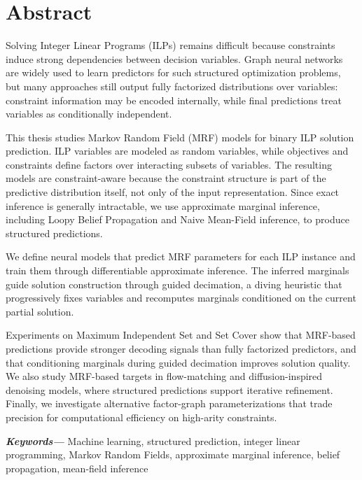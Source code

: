 \chapter*{Abstract}
    
Solving Integer Linear Programs (ILPs) remains difficult because constraints induce strong dependencies between decision variables. Graph neural networks are widely used to learn predictors for such structured optimization problems, but many approaches still output fully factorized distributions over variables: constraint information may be encoded internally, while final predictions treat variables as conditionally independent.

This thesis studies Markov Random Field (MRF) models for binary ILP solution prediction. ILP variables are modeled as random variables, while objectives and constraints define factors over interacting subsets of variables. The resulting models are constraint-aware because the constraint structure is part of the predictive distribution itself, not only of the input representation. Since exact inference is generally intractable, we use approximate marginal inference, including Loopy Belief Propagation and Naive Mean-Field inference, to produce structured predictions.

We define neural models that predict MRF parameters for each ILP instance and train them through differentiable approximate inference. The inferred marginals guide solution construction through guided decimation, a diving heuristic that progressively fixes variables and recomputes marginals conditioned on the current partial solution.

Experiments on Maximum Independent Set and Set Cover show that MRF-based predictions provide stronger decoding signals than fully factorized predictors, and that conditioning marginals during guided decimation improves solution quality. We also study MRF-based targets in flow-matching and diffusion-inspired denoising models, where structured predictions support iterative refinement. Finally, we investigate alternative factor-graph parameterizations that trade precision for computational efficiency on high-arity constraints.

\vspace{5pt}
{\noindent \small \textbf{\textit{Keywords---}} Machine learning, structured prediction, integer linear programming, Markov Random Fields, approximate marginal inference, belief propagation, mean-field inference}

